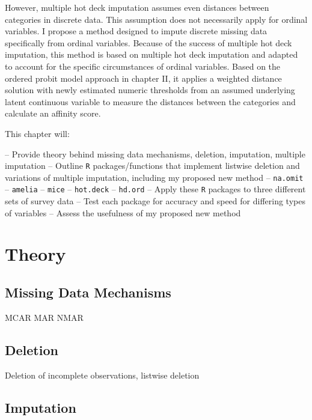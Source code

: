 \documentclass[12pt,econ]{sources/authesis}
\begin{document}
However, multiple hot deck imputation assumes even distances between categories in discrete data. This assumption does not necessarily apply for ordinal variables. I propose a method designed to impute discrete missing data specifically from ordinal variables. Because of the success of multiple hot deck imputation, this method is based on multiple hot deck imputation and adapted to account for the specific circumstances of ordinal variables. Based on the ordered probit model approach in chapter II, it applies a weighted distance solution with newly estimated numeric thresholds from an assumed underlying latent continuous variable to measure the distances between the categories and calculate an affinity score.

This chapter will:

-- Provide theory behind missing data mechanisms, deletion, imputation, multiple imputation
-- Outline \texttt{R} packages/functions that implement listwise deletion and variations of multiple imputation, including my proposed new method
-- \texttt{na.omit}
-- \texttt{amelia}
-- \texttt{mice}
-- \texttt{hot.deck}
-- \texttt{hd.ord}
-- Apply these \texttt{R} packages to three different sets of survey data
-- Test each package for accuracy and speed for differing types of variables
-- Assess the usefulness of my proposed new method

\hypertarget{ordmiss-theory}{%
\section{Theory}\label{ordmiss-theory}}

\hypertarget{ordmiss-theory-mechanisms}{%
\subsection{Missing Data Mechanisms}\label{ordmiss-theory-mechanisms}}

MCAR
MAR
NMAR

\hypertarget{ordmiss-theory-delete}{%
\subsection{Deletion}\label{ordmiss-theory-delete}}

Deletion of incomplete observations, listwise deletion

\hypertarget{ordmiss-theory-impute}{%
\subsection{Imputation}\label{ordmiss-theory-impute}}
\end{document}
